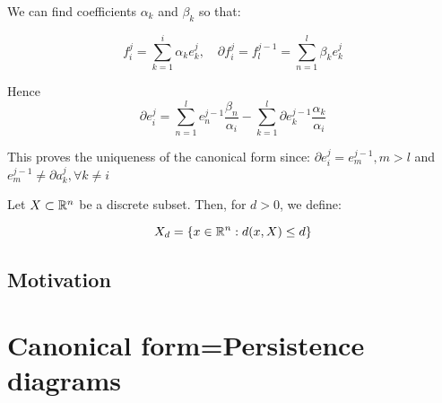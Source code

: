 \begin{prof}
We can find coefficients $\alpha_k$ and $\beta_k$ so that:

$$
f_i^j
=
\sum_{k=1}^i \alpha_k e_k^j,
\quad
\partial f_i^j = f_l^{j-1}
=
\sum_{n=1}^l \beta_k e_k^j
$$

Hence 
$$
\partial e_i^j=
\sum_{n=1}^l
e_n^{j-1}\frac{\beta_n}{\alpha_i}
-
\sum_{k=1}^l
\partial e_k^{j-1}\frac{\alpha_k}{\alpha_i}
$$

This proves the uniqueness of the canonical form since: $\partial e_i^j=e_m^{j-1},m>l$ and 
$e_m^{j-1}\neq \partial a_k^j, \forall k\neq i$
 
\end{prof}

\begin{definition}

Let $X\subset \mathbb{R}^n$ be a discrete subset. Then, for $d>0$, we define:

$$
X_d 
=
\{
x\in\mathbb{R}^n:
d(x,X)\leq d
\} 
$$
\end{definition}

\begin{definition}

\end{definition}

\section{Motivation}

\chapter{Canonical form=Persistence diagrams}


